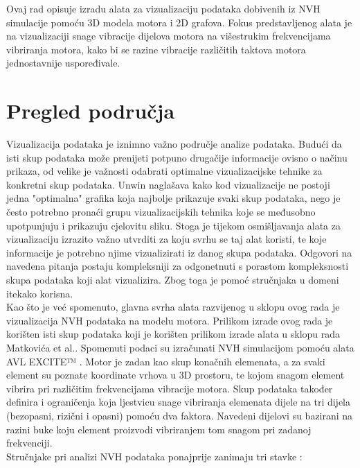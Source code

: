 \documentclass[times, utf8, diplomski]{fer}
\begin{document}
Ovaj rad opisuje izradu alata za vizualizaciju podataka dobivenih iz NVH simulacije pomoću 3D modela motora i 2D grafova. Fokus predstavljenog alata je na vizualizaciji snage vibracije dijelova motora na višestrukim frekvencijama vibriranja motora, kako bi se razine vibracije različitih taktova motora jednostavnije uspoređivale.

\chapter{Pregled područja} \label{area-overview-section}
Vizualizacija podataka je iznimno važno područje analize podataka. Budući da isti skup podataka može prenijeti potpuno drugačije informacije ovisno o načinu prikaza, od velike je važnosti odabrati optimalne vizualizacijske tehnike za konkretni skup podataka. Unwin \citep{Unwin2020Why} naglašava kako kod vizualizacije ne postoji jedna "optimalna" grafika koja najbolje prikazuje svaki skup podataka, nego je često potrebno pronaći grupu vizualizacijskih tehnika koje se međusobno upotpunjuju i prikazuju cjelovitu sliku. Stoga je tijekom osmišljavanja alata za vizualizaciju izrazito važno utvrditi za koju svrhu se taj alat koristi, te koje informacije je potrebno njime vizualizirati iz danog skupa podataka. Odgovori na navedena pitanja postaju kompleksniji za odgonetnuti s porastom kompleksnosti skupa podataka koji alat vizualizira. Zbog toga je pomoć stručnjaka u domeni itekako korisna.\\

Kao što je već spomenuto, glavna svrha alata razvijenog u sklopu ovog rada je vizualizacija NVH podataka na modelu motora. Prilikom izrade ovog rada je korišten isti skup podataka koji je korišten prilikom izrade alata u sklopu rada Matkovića et al.\citep{matkovic2021getting}. Spomenuti podaci su izračunati NVH simulacijom pomoću alata AVL EXCITE™ \citep{avlEXCITE}. Motor je zadan kao skup konačnih elemenata, a za svaki element su poznate koordinate vrhova u 3D prostoru, te kojom snagom element vibrira pri različitim frekvencijama vibracije motora. Skup podataka također definira i ograničenja koja ljestvicu snage vibriranja elemenata dijele na tri dijela (bezopasni, rizični i opasni) pomoću dva faktora. Navedeni dijelovi su bazirani na razini buke koju element proizvodi vibriranjem tom snagom pri zadanoj frekvenciji.\\

Stručnjake pri analizi NVH podataka ponajprije zanimaju tri stavke \citep{matkovic2021getting}:
\end{document}
